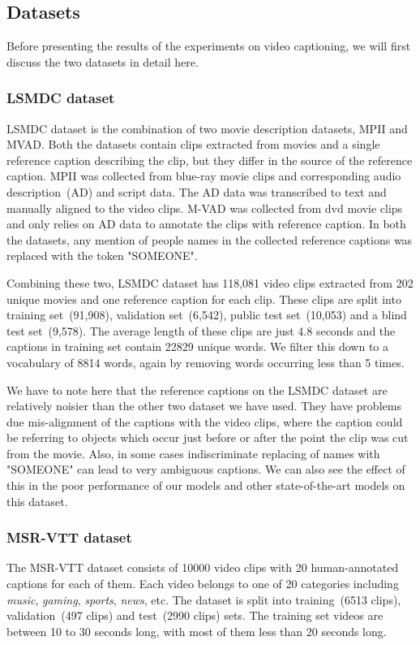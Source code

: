 \subsection{Datasets}
Before presenting the results of the experiments on video captioning, we will
first discuss the two datasets in detail here.
\subsubsection{LSMDC dataset}
\label{subsec:LsmdcData}
LSMDC dataset is the combination of two movie description datasets, MPII and
MVAD.
Both the datasets contain clips extracted from movies and a single reference
caption describing the clip, but they differ in the source of the reference
caption.
MPII was collected from blue-ray movie clips and corresponding audio
description~(AD) and script data.
The AD data was transcribed to text and manually aligned to the video clips.
M-VAD was collected from dvd movie clips and only relies on AD data to annotate
the clips with reference caption.
In both the datasets, any mention of people names in the collected reference
captions was replaced with the token "SOMEONE".

Combining these two, LSMDC dataset has 118,081 video clips extracted from 202
unique movies and one reference caption for each clip.
These clips are split into training set~(91,908), validation set~(6,542), public
test set~(10,053) and a blind test set~(9,578).
The average length of these clips are just 4.8 seconds and the captions
in training set contain 22829 unique words.
We filter this down to a vocabulary of 8814 words, again by removing words
occurring less than 5 times.

We have to note here that the reference captions on the LSMDC dataset are
relatively noisier than the other two dataset we have used.
They have problems due mis-alignment of the captions with the video clips,
where the caption could be referring to objects which occur just before or after
the point the clip was cut from the movie. 
Also, in some cases indiscriminate replacing of names with "SOMEONE" can lead to
very ambiguous captions.
We can also see the effect of this in the poor performance of our models and other
state-of-the-art models on this dataset.

\subsubsection{MSR-VTT dataset}
The MSR-VTT dataset consists of 10000 video clips with 20 human-annotated
captions for each of them.
Each video belongs to one of 20 categories including \emph{music},
\emph{gaming}, \emph{sports}, \emph{news}, etc.
The dataset is split into training~(6513 clips), validation~(497 clips) and
test~(2990 clips) sets. 
The training set videos are between 10 to 30 seconds long, with most of them
less than 20 seconds long.


